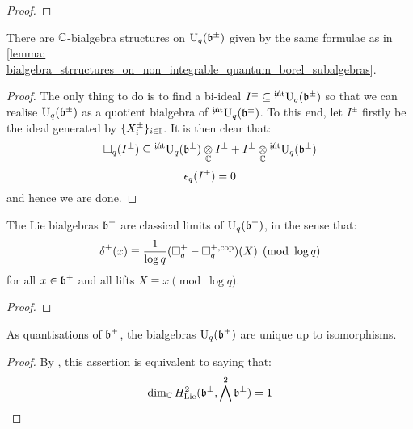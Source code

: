             \begin{proof}
                
            \end{proof}
        \begin{proposition} \label{prop: bialgebra_structures_on_quantum_borel_subalgebras}
            There are $\mathbb{C}$-bialgebra structures on $\mathrm{U}_q(\mathfrak{b}^{\pm})$ given by the same formulae as in \ref{lemma: bialgebra_strructures_on_non_integrable_quantum_borel_subalgebras}.
        \end{proposition}
            \begin{proof}
                The only thing to do is to find a bi-ideal $I^{\pm} \subseteq {}^{\not \mathrm{int}}\mathrm{U}_q(\mathfrak{b}^{\pm})$ so that we can realise $\mathrm{U}_q(\mathfrak{b}^{\pm})$ as a quotient bialgebra of ${}^{\not \mathrm{int}}\mathrm{U}_q(\mathfrak{b}^{\pm})$. To this end, let $I^{\pm}$ firstly be the ideal generated by $\{X_i^{\pm}\}_{i \in \mathbb{I}}$. It is then clear that:
                    $$\Box_q(I^{\pm}) \subseteq {}^{\not \integrable}\rmU_q(\b^{\pm}) \tensor_{\bbC} I^{\pm} + I^{\pm} \tensor_{\bbC} {}^{\not \integrable}\rmU_q(\b^{\pm})$$
                    $$\epsilon_q(I^{\pm}) = 0$$
                and hence we are done.
            \end{proof}
        \begin{corollary}
            The Lie bialgebras $\mathfrak{b}^{\pm}$ are classical limits of $\mathrm{U}_q(\mathfrak{b}^{\pm})$, in the sense that:
                $$\delta^{\pm}(x) \equiv \frac{1}{\log q}( \Box_q^{\pm} - \Box_q^{\pm, \mathrm{cop}} )(X) \pmod{\log q}$$
            for all $x \in \mathfrak{b}^{\pm}$ and all lifts $X \equiv x \pmod{\log q}$. 
        \end{corollary}
            \begin{proof}
                
            \end{proof}
        \begin{proposition} \label{prop: quantum_borel_algberas_uniqueness}
            As quantisations of $\mathfrak{b}^{\pm}$, the bialgebras $\mathrm{U}_q(\mathfrak{b}^{\pm})$ are unique up to isomorphisms. 
        \end{proposition}
            \begin{proof}
                By \cite{etingof_kazhdan_quantisation_1}, this assertion is equivalent to saying that:
                    $$\dim_{\mathbb{C}} H^2_{\mathrm{Lie}}(\mathfrak{b}^{\pm}, \bigwedge^2 \mathfrak{b}^{\pm}) = 1$$
            \end{proof}
